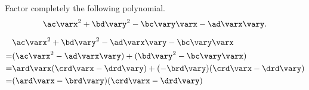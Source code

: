 






\pgfmathtruncatemacro{\ac}{\ard*\crd}
\pgfmathtruncatemacro{\ad}{\ard*\drd}
\pgfmathtruncatemacro{\bc}{\brd*\crd}
\pgfmathtruncatemacro{\bd}{\brd*\drd}



\edef\varxy{\varx}

\edef\varab{\vara}

\edef\varpq{\varb}

\edef\varmn{\vary}








Factor completely the following polynomial.
\[\ac\varx^2  +{\bd}\vary^2 - {\bc}\vary\varx -\ad\varx\vary.\]

\begin{solution}
\[\begin{split}
&\ac\varx^2 +{\bd}\vary^2 -{\ad}\varx\vary -{\bc}\vary\varx \\
=&(\ac\varx^2 -{\ad}\varx\vary) + ({\bd}\vary^2-\bc\vary\varx)\\
=&\ard\varx(\crd\varx - {\drd}\vary)+ (-{\brd}\vary)(\crd\varx-{\drd}\vary)\\
=&(\ard\varx - {\brd}\vary)(\crd\varx -{\drd}\vary)
\end{split}
\]
\end{solution}